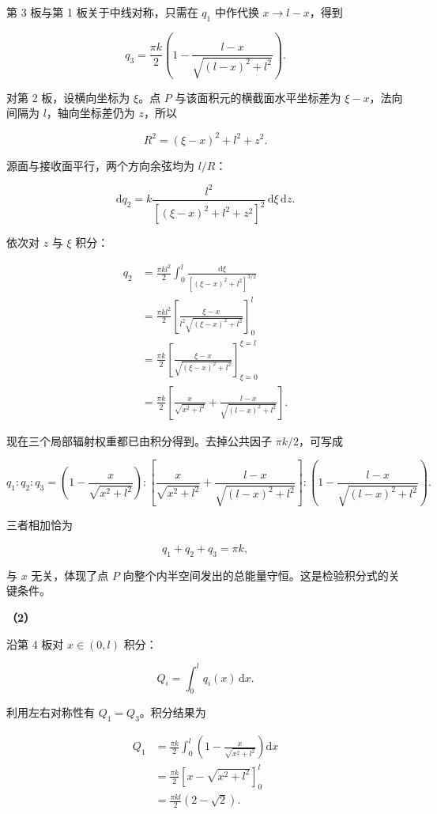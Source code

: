 \documentclass[12pt,a4paper,UTF8]{ctexart}
\begin{document}
第 3 板与第 1 板关于中线对称，只需在 \(q_1\) 中作代换 \(x\to l-x\)，得到

\[q_3=\frac{\pi k}{2}
\left(1-\frac{l-x}{\sqrt{(l-x)^2+l^2}}\right).\]

对第 2 板，设横向坐标为 \(\xi\)。点 \(P\) 与该面积元的横截面水平坐标差为
\(\xi-x\)，法向间隔为 \(l\)，轴向坐标差仍为 \(z\)，所以

\[R^2=(\xi-x)^2+l^2+z^2.\]

源面与接收面平行，两个方向余弦均为 \(l/R\)：

\[\mathrm dq_2
=k\frac{l^2}{[(\xi-x)^2+l^2+z^2]^2}\,\mathrm d\xi\,\mathrm dz.\]

依次对 \(z\) 与 \(\xi\) 积分：

\[\begin{aligned}
q_2
&=\frac{\pi kl^2}{2}
\int_0^l
\frac{\mathrm d\xi}{[(\xi-x)^2+l^2]^{3/2}}\\
&=\frac{\pi kl^2}{2}
\left[
\frac{\xi-x}{l^2\sqrt{(\xi-x)^2+l^2}}
\right]_{0}^{l}\\
&=\frac{\pi k}{2}
\left[
\frac{\xi-x}{\sqrt{(\xi-x)^2+l^2}}
\right]_{\xi=0}^{\xi=l}\\
&=\frac{\pi k}{2}\left[
\frac{x}{\sqrt{x^2+l^2}}
+\frac{l-x}{\sqrt{(l-x)^2+l^2}}
\right].
\end{aligned}\]

现在三个局部辐射权重都已由积分得到。去掉公共因子 \(\pi k/2\)，可写成

\[\boxed{
q_1:q_2:q_3=
\left(1-\frac{x}{\sqrt{x^2+l^2}}\right):
\left[
\frac{x}{\sqrt{x^2+l^2}}
+\frac{l-x}{\sqrt{(l-x)^2+l^2}}
\right]:
\left(1-\frac{l-x}{\sqrt{(l-x)^2+l^2}}\right)
}.\]

三者相加恰为

\[q_1+q_2+q_3=\pi k,\]

与 \(x\) 无关，体现了点 \(P\)
向整个内半空间发出的总能量守恒。这是检验积分式的关键条件。

\textbf{（2）}

沿第 4 板对 \(x\in(0,l)\) 积分：

\[Q_i=\int_0^lq_i(x)\,\mathrm dx.\]

利用左右对称性有 \(Q_1=Q_3\)。积分结果为

\[\begin{aligned}
Q_1
&=\frac{\pi k}{2}
\int_0^l\left(1-\frac{x}{\sqrt{x^2+l^2}}\right)\mathrm dx\\
&=\frac{\pi k}{2}
\left[x-\sqrt{x^2+l^2}\right]_{0}^{l}\\
&=\frac{\pi kl}{2}(2-\sqrt2).
\end{aligned}\]
\end{document}

